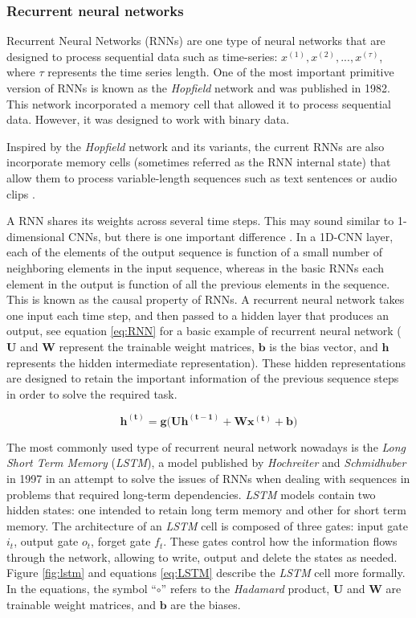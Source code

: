 \subsubsection{Recurrent neural networks}
\sloppy Recurrent Neural Networks (RNNs) are one type of neural networks that are designed to process sequential data such as time-series: $x^{(1)}, x^{(2)}, ..., x^{(\tau)}$, where $\tau$ represents the time series length. One of the most important primitive version of RNNs is known as the \textit{Hopfield} network \cite{hopfield1982} and was published in 1982. This network incorporated a memory cell that allowed it to process sequential data. However, it was designed to work with binary data. 

Inspired by the \textit{Hopfield} network and its variants, the current RNNs are also incorporate memory cells (sometimes referred as the RNN internal state) that allow them to process variable-length sequences such as text sentences or audio clips \cite{haykin1998}. 

A RNN shares its weights across several time steps. This may sound similar to 1-dimensional CNNs, but there is one important difference \cite{Goodfellow2016}. In a 1D-CNN layer, each of the elements of the output sequence is function of a small number of neighboring elements in the input sequence, whereas in the basic RNNs each element in the output is function of all the previous elements in the sequence. This is known as the causal property of RNNs. A recurrent neural network takes one input each time step, and then passed to a hidden layer that produces an output, see equation \ref{eq:RNN} for a basic example of recurrent neural network ($\mathbf{U}$ and $\mathbf{W}$ represent the trainable weight matrices, $\mathbf{b}$ is the bias vector, and $\mathbf{h}$ represents the hidden intermediate representation). These hidden representations are designed to retain the important information of the previous sequence steps in order to solve the required task.

\begin{equation}
\label{eq:RNN}
\mathbf{h^{( t )}} = \mathbf{g(U h^{( t-1 )}} + \mathbf{W x^{( t )}} + \mathbf{b})
\end{equation}

The most commonly used type of recurrent neural network nowadays is the \textit{Long Short Term Memory} (\textit{LSTM}), a model published by  \textit{Hochreiter} and \textit{Schmidhuber} in 1997 \cite{Schmidhuber1997} in an attempt to solve the issues of RNNs when dealing with sequences in problems that required long-term dependencies. \textit{LSTM} models contain two hidden states: one intended to retain long term memory and other for short term memory. The architecture of an \textit{LSTM} cell is composed of three gates: input gate $i_t$, output gate $o_t$, forget gate $f_t$. These gates control how the information flows through the network, allowing to write, output and delete the states as needed. Figure \ref{fig:lstm} and equations \ref{eq:LSTM} describe the \textit{LSTM} cell more formally. In the equations, the symbol ``$\circ$'' refers to the \textit{Hadamard} product, $\mathbf{U}$ and $\mathbf{W}$ are trainable weight matrices, and $\mathbf{b}$ are the biases. 

